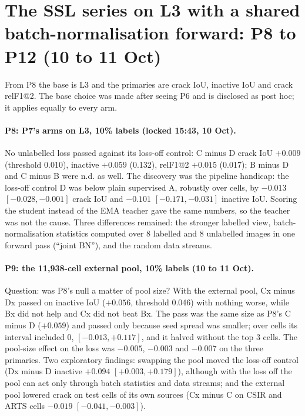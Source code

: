 \section{The SSL series on L3 with a shared batch-normalisation forward: P8 to P12 (10 to 11 Oct)}\label{sec:pseries-joint}

From P8 the base is L3 and the primaries are crack IoU, inactive IoU and crack relF1@2. The base choice was made after seeing P6
and is disclosed as post hoc; it applies equally to every arm.

\paragraph{P8: P7's arms on L3, 10\% labels (locked 15:43, 10 Oct).} No unlabelled loss passed against its loss-off control: C minus
D crack IoU $+0.009$ (threshold 0.010), inactive $+0.059$ (0.132), relF1@2 $+0.015$ (0.017); B minus D and C minus B were n.d. as
well. The discovery was the pipeline handicap: the loss-off control D was below plain supervised A, robustly over cells, by
$-0.013$ $[-0.028, -0.001]$ crack IoU and $-0.101$ $[-0.171, -0.031]$ inactive IoU. Scoring the student instead of the EMA teacher gave
the same numbers, so the teacher was not the cause. Three differences remained: the stronger labelled view, batch-normalisation
statistics computed over 8 labelled and 8 unlabelled images in one forward pass (``joint BN''), and the random data streams.

\paragraph{P9: the 11,938-cell external pool, 10\% labels (10 to 11 Oct).} Question: was P8's null a matter of pool size? With the
external pool, Cx minus Dx passed on inactive IoU ($+0.056$, threshold 0.046) with nothing worse, while Bx did not help and Cx did
not beat Bx. The pass was the same size as P8's C minus D ($+0.059$) and passed only because seed spread was smaller; over cells its
interval included 0, $[-0.013, +0.117]$, and it halved without the top 3 cells. The pool-size effect on the loss was $-0.005$,
$-0.003$ and $-0.007$ on the three primaries. Two exploratory findings: swapping the pool moved the loss-off control (Dx minus D
inactive $+0.094$ $[+0.003, +0.179]$), although with the loss off the pool can act only through batch statistics and data streams; and
the external pool lowered crack on test cells of its own sources (Cx minus C on CSIR and ARTS cells $-0.019$ $[-0.041, -0.003]$).

